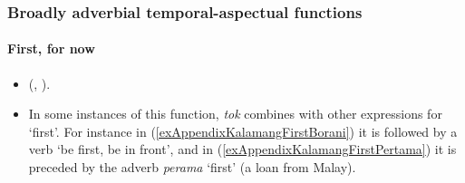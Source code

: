 \subsubsection{Broadly adverbial temporal-aspectual functions}
\paragraph{First, for now}\label{appendixKalamangFirst}
\begin{itemize} 
	\item  \citeauthor{VisserKalamangDictionary} (\citeyear*{VisserKalamangDictionary}, \citeyear[354]{Visser2022}).
	\item In some instances of this function, \textit{tok} combines with other expressions for \lq first'. For instance in (\ref{exAppendixKalamangFirstBorani}) it is followed by a verb \lq be first, be in front', and in (\ref{exAppendixKalamangFirstPertama}) it is preceded by the adverb \textit{perama} \lq first' (a loan from Malay).
\end{itemize}

